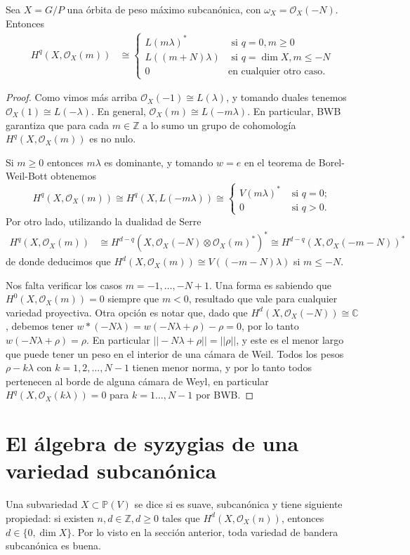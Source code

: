 \documentclass[11pt,fleqn]{article}
\newcommand\CC{\mathbb C}
\newcommand\ZZ{\mathbb Z}
\newcommand\PP{\mathbb P}
\renewcommand\O{\mathcal O}
\newcommand\ot{\otimes}
\newcommand\buena{buena}
\begin{document}
\begin{Proposition}
Sea $X = G/P$ una órbita de peso máximo subcanónica, con $\omega_X = \O_X(-N)$. Entonces 
\begin{align*}
H^q(X, \O_X(m)) &\cong 
\begin{cases}
L(m\lambda)^* & \mbox{ si } q = 0, m \geq 0 \\
L((m+N)\lambda) & \mbox{ si } q = \dim X, m \leq -N \\
0 & \mbox{en cualquier otro caso.}
\end{cases}
\end{align*}
\end{Proposition}
\begin{proof}
Como vimos más arriba $\O_X(-1) \cong L(\lambda)$, y tomando duales tenemos $\O_X(1) 
\cong L(-\lambda)$. En general, $\O_X(m) \cong L(-m\lambda)$. En particular, BWB 
garantiza que para cada $m \in \ZZ$ a lo sumo un grupo de cohomología $H^q(X, \O_X(m))$ 
es no nulo.

Si $m \geq 0$ entonces $m\lambda$ es dominante, y tomando $w = e$ en el teorema de 
Borel-Weil-Bott obtenemos
\[
H^q(X, \O_X(m)) \cong H^q(X, L(-m\lambda)) \cong
\begin{cases}
V(m\lambda)^* & \mbox{ si } q = 0; \\
0 & \mbox{ si } q >0.
\end{cases}
\]
Por otro lado, utilizando la dualidad de Serre
\begin{align*}
H^q(X, \O_X(m)) 
	&\cong H^{d-q}(X, \O_X(-N) \ot \O_X(m)^*)^* 
	\cong H^{d-q}(X, \O_X(-m-N))^* 
\end{align*}
de donde deducimos que $H^d(X, \O_X(m)) \cong V((-m-N)\lambda)$ si $m \leq -N$.

Nos falta verificar los casos $m = -1, \ldots, -N+1$. Una forma es sabiendo que $H^0(X, 
\O_X(m)) = 0$ siempre que $m < 0$, resultado que vale para cualquier variedad proyectiva.
Otra opción es notar que, dado que $H^d(X, \O_X(-N)) \cong \CC$, debemos tener $w * 
(-N\lambda) = w(-N \lambda + \rho) - \rho = 0$, por lo tanto $w(-N \lambda + \rho) = 
\rho$. En particular $||-N \lambda + \rho|| = ||\rho||$, y este es el menor largo que 
puede tener un peso en el interior de una cámara de Weil. Todos los pesos $\rho - 
k\lambda$ con $k = 1, 2, \ldots, N-1$ tienen menor norma, y por lo tanto todos 
pertenecen al borde de alguna cámara de Weyl, en particular $H^q(X, \O_X(k \lambda)) = 
0$ para $k = 1 \ldots, N-1$ por BWB.
\end{proof}

\section{El álgebra de syzygias de una variedad subcanónica}
Una subvariedad $X \subset \PP(V)$ se dice \newterm{\buena} si es suave, subcanónica y
tiene siguiente propiedad: si existen $n,d \in \ZZ, d \geq 0$ tales que $H^d(X, 
\O_X(n))$, entonces $d \in \{0, \dim X\}$. Por lo visto en la sección anterior, toda 
variedad de bandera subcanónica es \buena.
\end{document}
